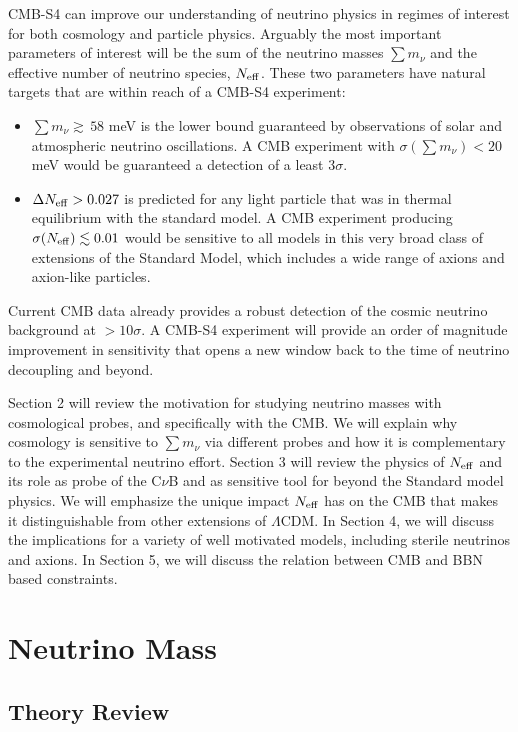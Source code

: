 CMB-S4 can improve our understanding of neutrino physics in regimes of interest for both cosmology and particle physics.  Arguably the most important parameters of interest will be the sum of the neutrino masses $\sum m_\nu$ and the effective number of neutrino species, $N_{\rm eff}$.  These two parameters have natural targets that are within reach of a CMB-S4 experiment:
\begin{itemize}
\item $ \sum m_\nu \gtrsim \, 58$ meV is the lower bound guaranteed by observations of solar and atmospheric neutrino oscillations.  A CMB experiment with $\sigma(\sum m_\nu) < 20$ meV would be guaranteed a detection of a least 3$\sigma$.
\item $\Delta N_{\rm eff} >  0.027$ is predicted for any light particle that was in thermal equilibrium with the standard model.  A CMB experiment producing $\sigma(N_{\rm eff}) \lesssim 0.01$ would be sensitive to all models in this very broad class of extensions of the Standard Model, which includes a wide range of axions and axion-like particles.  
\end{itemize}
Current CMB data already provides a robust detection of the cosmic neutrino background at $>10 \sigma$.  A CMB-S4 experiment will provide an order of magnitude improvement in sensitivity that opens a new window back to the time of neutrino decoupling and beyond.

Section 2 will review the motivation for studying neutrino masses with cosmological probes, and specifically with the CMB.  We will explain why cosmology is sensitive to $\sum m_\nu$ via different probes and how it is complementary to the experimental neutrino effort.  Section 3 will review the physics of $N_{\rm eff}$ and its role as probe of the C$\nu$B and as sensitive tool for beyond the Standard model physics.  We will emphasize the unique impact $N_{\rm eff}$ has on the CMB that makes it distinguishable from other extensions of $\Lambda$CDM.  In Section 4, we will discuss the implications for a variety of well motivated models, including sterile neutrinos and axions.  In Section 5, we will discuss the relation between CMB and BBN based constraints.  

\section{Neutrino Mass}

\subsection{Theory Review}

